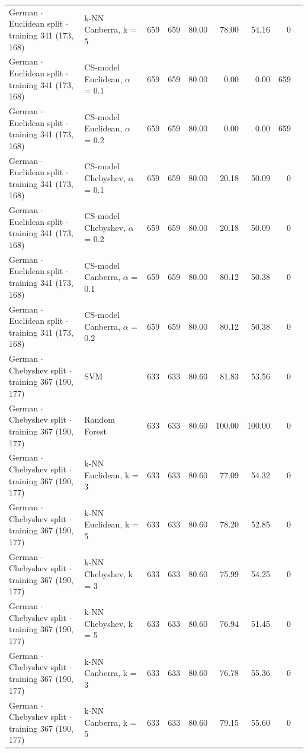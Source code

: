 \begin{longtable}{llrrrrrrl}
  German $\cdot$ Euclidean split $\cdot$ training 341 (173, 168) & k-NN Canberra, k = 5 & 659 & 659 & 80.00 & 78.00 & 54.16 & 0 &  \\
  German $\cdot$ Euclidean split $\cdot$ training 341 (173, 168) & CS-model Euclidean, $\alpha$ = 0.1 & 659 & 659 & 80.00 & 0.00 & 0.00 & 659 &  \\
  German $\cdot$ Euclidean split $\cdot$ training 341 (173, 168) & CS-model Euclidean, $\alpha$ = 0.2 & 659 & 659 & 80.00 & 0.00 & 0.00 & 659 &  \\
  German $\cdot$ Euclidean split $\cdot$ training 341 (173, 168) & CS-model Chebyshev, $\alpha$ = 0.1 & 659 & 659 & 80.00 & 20.18 & 50.09 & 0 &  \\
  German $\cdot$ Euclidean split $\cdot$ training 341 (173, 168) & CS-model Chebyshev, $\alpha$ = 0.2 & 659 & 659 & 80.00 & 20.18 & 50.09 & 0 &  \\
  German $\cdot$ Euclidean split $\cdot$ training 341 (173, 168) & CS-model Canberra, $\alpha$ = 0.1 & 659 & 659 & 80.00 & 80.12 & 50.38 & 0 &  \\
  German $\cdot$ Euclidean split $\cdot$ training 341 (173, 168) & CS-model Canberra, $\alpha$ = 0.2 & 659 & 659 & 80.00 & 80.12 & 50.38 & 0 &  \\
  German $\cdot$ Chebyshev split $\cdot$ training 367 (190, 177) & SVM & 633 & 633 & 80.60 & 81.83 & 53.56 & 0 &  \\
  German $\cdot$ Chebyshev split $\cdot$ training 367 (190, 177) & Random Forest & 633 & 633 & 80.60 & 100.00 & 100.00 & 0 &  \\
  German $\cdot$ Chebyshev split $\cdot$ training 367 (190, 177) & k-NN Euclidean, k = 3 & 633 & 633 & 80.60 & 77.09 & 54.32 & 0 &  \\
  German $\cdot$ Chebyshev split $\cdot$ training 367 (190, 177) & k-NN Euclidean, k = 5 & 633 & 633 & 80.60 & 78.20 & 52.85 & 0 &  \\
  German $\cdot$ Chebyshev split $\cdot$ training 367 (190, 177) & k-NN Chebyshev, k = 3 & 633 & 633 & 80.60 & 75.99 & 54.25 & 0 &  \\
  German $\cdot$ Chebyshev split $\cdot$ training 367 (190, 177) & k-NN Chebyshev, k = 5 & 633 & 633 & 80.60 & 76.94 & 51.45 & 0 &  \\
  German $\cdot$ Chebyshev split $\cdot$ training 367 (190, 177) & k-NN Canberra, k = 3 & 633 & 633 & 80.60 & 76.78 & 55.36 & 0 &  \\
  German $\cdot$ Chebyshev split $\cdot$ training 367 (190, 177) & k-NN Canberra, k = 5 & 633 & 633 & 80.60 & 79.15 & 55.60 & 0 &  \\

\end{longtable}
